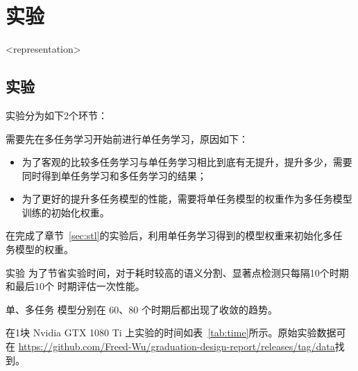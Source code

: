 \documentclass[../main]{subfiles}
\begin{document}
\mode*

\chapter{实验}%
\label{cha:experiment}
\mode<representation>{%
  \section{实验}%
  \label{sec:experiment}
}

实验分为如下2个环节：


需要先在多任务学习开始前进行单任务学习，原因如下：

\begin{itemize}
  \item 为了客观的比较多任务学习与单任务学习相比到底有无提升，提升多少，需要
    同时得到单任务学习和多任务学习的结果；
  \item 为了更好的提升多任务模型的性能，需要将单任务模型的权重作为多任务模型
    训练的初始化权重。
\end{itemize}


在完成了章节~\ref{sec:stl}的实验后，利用单任务学习得到的模型权重来初始化多任
务模型的权重。

\begin{frame}{实验}
  为了节省实验时间，对于耗时较高的语义分割、显著点检测只每隔10个时期和最后10个
  时期评估一次性能。

  单、多任务
  模型分别在 60、80 个时期后都出现了收敛的趋势。
\end{frame}

在1块 Nvidia GTX 1080 Ti 上实验的时间如表~\ref{tab:time}所示。原始实验数据可在
\url{https://github.com/Freed-Wu/graduation-design-report/releases/tag/data}找
到。
\end{document}
